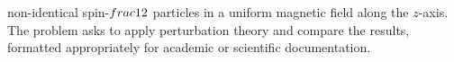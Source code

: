 \begin{enumerate}
non-identical spin-$\\frac{1}{2}$ particles in a uniform magnetic field along the $z$-axis. The problem asks to apply perturbation theory and compare the results, formatted appropriately for academic or scientific documentation.
\end{enumerate}
